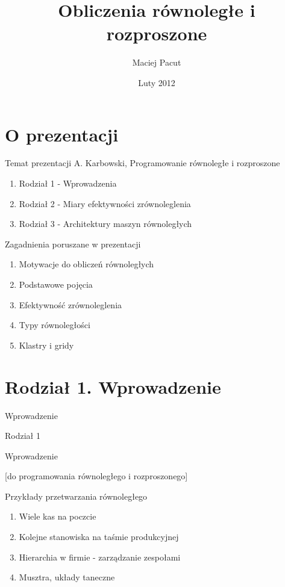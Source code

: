\documentclass{beamer}
\title{Obliczenia równoległe i rozproszone}
\author{Maciej Pacut}
\date{Luty 2012}
\begin{document}
\section{O prezentacji}

\begin{frame}
  \titlepage
\end{frame}

\begin{frame}{Temat prezentacji}
  A. Karbowski, Programowanie równoległe i rozproszone
  \begin{enumerate}
  \item Rodział 1 - Wprowadzenia
  \item Rodział 2 - Miary efektywności zrównoleglenia
  \item Rodział 3 - Architektury maszyn równoległych
  \end{enumerate}
\end{frame}

\begin{frame}{Zagadnienia poruszane w prezentacji}
  \begin{enumerate}
  \item Motywacje do obliczeń równoległych
  \item Podstawowe pojęcia
  \item Efektywność zrównoleglenia
  \item Typy równoległości
  \item Klastry i gridy
  \end{enumerate}
\end{frame}

\section{Rodział 1. Wprowadzenie}

\begin{frame}{Wprowadzenie}
  \huge
  \begin{center}
    Rodział 1

    Wprowadzenie

    \large
    [do programowania równoległego i rozproszonego]
  \end{center}
\end{frame}


\begin{frame}{Przykłady przetwarzania równoległego}
  \begin{enumerate}
  \item Wiele kas na poczcie
  \item Kolejne stanowiska na taśmie produkcyjnej
  \item Hierarchia w firmie - zarządzanie zespołami
  \item Musztra, układy taneczne
  \end{enumerate}
\end{frame}
\end{document}
